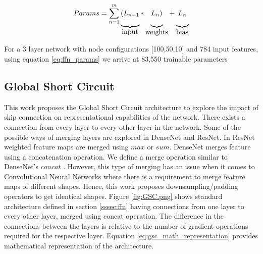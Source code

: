 \documentclass{article}
\begin{document}
\begin{equation}
\label{eq:ffn_params}
Params= \sum_{n=1}^{m}
\underbrace{(L_{n-1}\rule[-12pt]{0pt}{5pt}}_{\mbox{input}}
*\underbrace{L_{n})\rule[-12pt]{0pt}{5pt}}_{\mbox{weights}}
+\underbrace{L_{n}\rule[-12pt]{0pt}{5pt}}_{\mbox{bias}}
\end{equation}

For a 3 layer network with node configurations [100,50,10] and 784 input features, using equation \ref{eq:ffn_params} we arrive at 83,550 trainable parameters


\subsection{Global Short Circuit}
This work proposes the Global Short Circuit architecture to explore the impact of skip connection on representational capabilities of the network. There exists a connection from every layer to every other layer in the network. Some of the possible ways of merging layers are explored in DenseNet\cite{Li2018DenselyCC} and ResNet\cite{He2016DeepRL}. In ResNet weighted feature maps are merged using $max$ or $sum$. DenseNet merges feature using a concatenation operation. We define a merge operation similar to DenseNet's $concat$ . However, this type of merging has an issue when it comes to Convolutional Neural Networks where there is a requirement to merge feature maps of different shapes. Hence, this work proposes downsampling/padding operators to get identical shapes. Figure \ref{fig:GSC.png} shows standard architecture defined in section \ref{sssec:ffn} having connections from one layer to every other layer, merged using concat operation. The difference in the connections between the layers is relative to the number of gradient operations required for the respective layer. Equation \ref{eq:gsc_math_representation} provides mathematical representation of the architecture.
\end{document}
